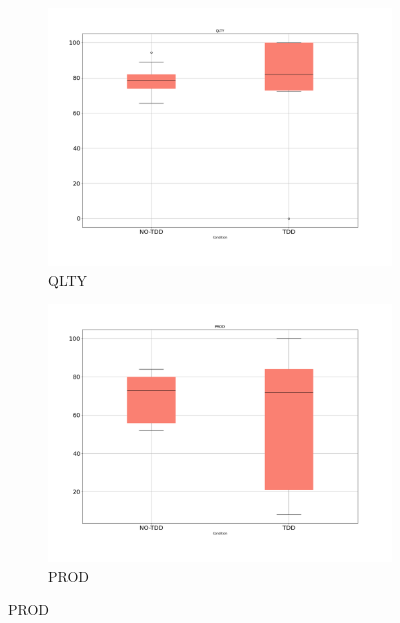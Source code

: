\begin{figure}[H]
    \centering
    \begin{subfigure}{0.5\textwidth}
        \includegraphics[width=\linewidth]{figures/box_plots/task1_2/QLTY.png}
        \caption{QLTY}
        \label{bp_task1_2_qlty}
    \end{subfigure}\hfil
    \begin{subfigure}{0.5\textwidth}
        \includegraphics[width=\linewidth]{figures/box_plots/task1_2/PROD.png}
        \caption{PROD}
        \label{bp_task1_2_prod}
    \end{subfigure}

    \medskip


\end{figure}
